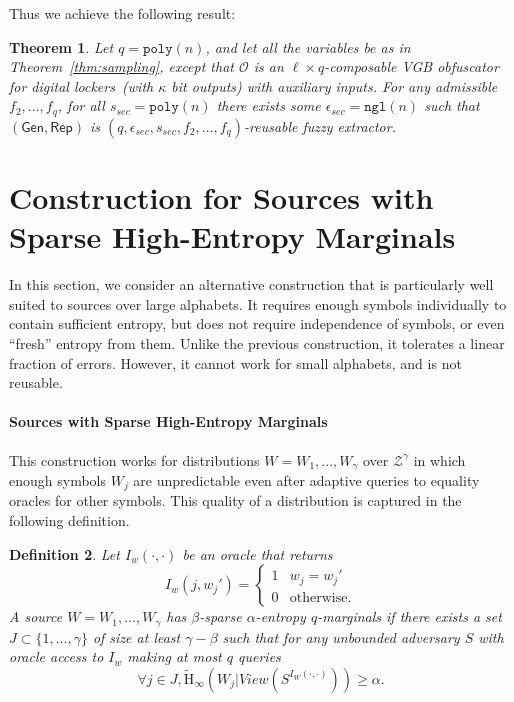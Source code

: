 \documentclass[11pt]{article}
\newtheorem{theorem}{Theorem}[section]
\newtheorem{definition}[theorem]{Definition}
\newcommand{\thref}[1]{\mbox{Theorem~\ref{#1}}}
\newcommand{\class}[1]{{\ensuremath{\mathsf{#1}}}}
\newcommand{\gen}{\ensuremath{\class{Gen}}\xspace}
\newcommand{\rep}{\ensuremath{\class{Rep}}\xspace}
\newcommand{\poly}{\ensuremath{\mathtt{poly}}\xspace}
\newcommand{\ngl}{\ensuremath{\mathtt{ngl}}\xspace}
\newcommand{\Hav}{\tilde{\mathrm{H}}_\infty}
\begin{document}
  Thus we achieve the following result:

\begin{theorem}
\label{thm:reusability}
Let $q = \poly(n)$, and let all the variables be as in \thref{thm:sampling}, except that $\mathcal{O}$ is an $\ell\times q$-composable VGB obfuscator for digital lockers~(with $\kappa$ bit outputs) with auxiliary inputs.  For any admissible $f_2,..., f_q$, for all $s_{sec} = \poly(n)$ there exists some $\epsilon_{sec} = \ngl(n)$ such that $(\gen, \rep)$ is $(q, \epsilon_{sec}, s_{sec}, f_2,..., f_q)$-reusable fuzzy extractor.
\end{theorem}


\section{Construction for Sources with Sparse High-Entropy Marginals}
\label{sec:cor construction}
In this section, we consider an alternative construction that is particularly well suited to sources over large alphabets. It requires enough symbols individually to contain sufficient entropy, but does not require independence of symbols, or even ``fresh'' entropy from them. Unlike the previous construction, it tolerates a linear fraction of errors. However, it cannot work for small alphabets, and is not reusable.

\paragraph{Sources with Sparse High-Entropy Marginals} This construction works for distributions $W=W_1, ... ,W_\gamma$ over $\mathcal{Z}^\gamma $ in which enough symbols $W_j$ are unpredictable even after adaptive queries to equality oracles for other symbols. This quality of a distribution is captured in the following definition.

\begin{definition}
\label{def:block guessable}
Let $I_w (\cdot, \cdot)$ be an oracle that returns \[I_w(j, w_j')=
\begin{cases}
1 & w_j = w_j'\\
0 & \text{otherwise}.
\end{cases}
\]
A source $W = W_1, ... ,W_\gamma$ has $\beta$-sparse $\alpha$-entropy $q$-marginals if there exists a set $J\subset\{1,..., \gamma\}$ of size at least $\gamma -\beta$ such that for any unbounded adversary $S$ with oracle access to $I_w$ making at most $q$ queries
\[
\forall j\in J, \Hav(W_j |View(S^{I_{W}(\cdot, \cdot)}))\geq \alpha.
\]
\end{definition}
\end{document}

